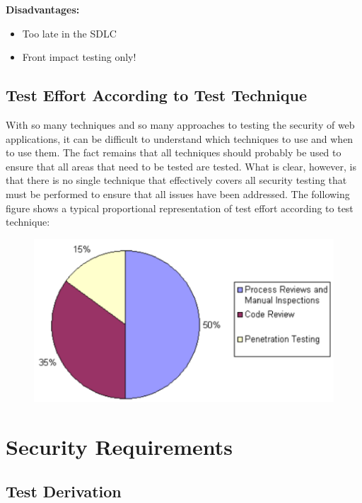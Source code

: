 		{\bf Disadvantages:}
		\begin{itemize}
			\item Too late in the SDLC
			\item Front impact testing only!
		\end{itemize}

		\clearpage
		\subsection{Test Effort According to Test Technique}
			With so many techniques and so many approaches to testing the security of web
			applications, it can be difficult to understand which techniques to use and when 
			to use them. The fact remains that all techniques should probably be used to 
			ensure that all areas that need to be tested are tested. What is clear, however, 
			is that there is no single technique that effectively covers all security testing 
			that must be performed to ensure that all issues have been addressed. The following
			figure shows a typical proportional representation of test effort according to 
			test technique:

			\begin{figure}[H]
				\centering
				\includegraphics[scale=0.6]{pics/effort.png}
			\end{figure}

	\clearpage
	\section{Security Requirements}

		\subsection{Test Derivation}


